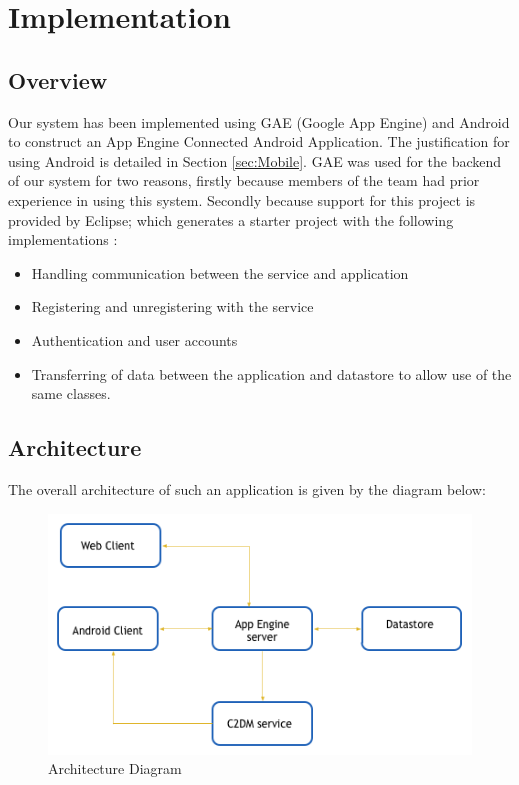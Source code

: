 \section{Implementation}

\subsection{Overview}
Our system has been implemented using GAE (Google App Engine) and Android to construct an App Engine Connected Android Application.  
The justification for using Android is detailed in Section \ref{sec:Mobile}.
GAE was used for the backend of our system for two reasons, firstly because members of the team had prior experience in using this system. 
Secondly because support for this project is provided by Eclipse; which generates a starter project with the following implementations \cite{AppEngine}:
\begin{itemize}
	\item{Handling communication between the service and application}
	\item{Registering and unregistering with the service}
	\item{Authentication and user accounts}
	\item{Transferring of data between the application and datastore to allow use of the same classes}.
\end{itemize}

\subsection{Architecture}
The overall architecture of such an application is given by the diagram below:

\begin{figure}[ht]
\begin{center}
\includegraphics[trim = 0mm 0mm 0mm 0mm, clip, scale=0.7]{images/arch.png}
\caption{Architecture Diagram \cite{AppEngine}} 
\end{center}
\end{figure}

